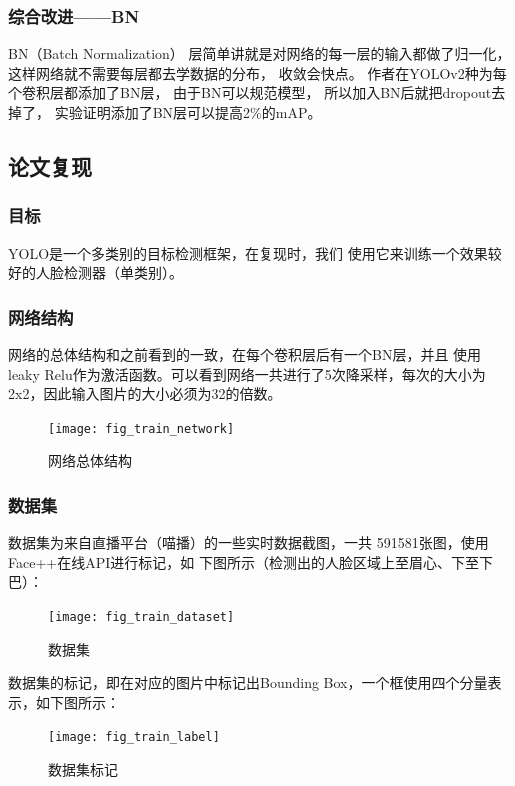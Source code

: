 \documentclass[a4paper, notitlepage]{article}
\begin{document}
\subsubsection{综合改进——BN}
BN（Batch Normalization）
层简单讲就是对网络的每一层的输入都做了归一化，
这样网络就不需要每层都去学数据的分布，
收敛会快点。
作者在YOLOv2种为每个卷积层都添加了BN层，
由于BN可以规范模型，
所以加入BN后就把dropout去掉了，
实验证明添加了BN层可以提高2\(\%\)的mAP。

\subsection{论文复现}

\subsubsection{目标}
YOLO是一个多类别的目标检测框架，在复现时，我们
使用它来训练一个效果较好的人脸检测器（单类别）。

\subsubsection{网络结构}
网络的总体结构和之前看到的一致，在每个卷积层后有一个BN层，并且
使用leaky Relu作为激活函数。可以看到网络一共进行了5次降采样，每次的大小为
2x2，因此输入图片的大小必须为32的倍数。

\begin{figure}[H]
    \centering
    \texttt{[image: fig\_train\_network]}
    \caption{网络总体结构}
    \label{fig:example}
\end{figure}

\subsubsection{数据集}
数据集为来自直播平台（喵播）的一些实时数据截图，一共
591581张图，使用Face++在线API进行标记，如
下图所示（检测出的人脸区域上至眉心、下至下巴）：

\begin{figure}[H]
    \centering
    \texttt{[image: fig\_train\_dataset]}
    \caption{数据集}
    \label{fig:example}
\end{figure}

数据集的标记，即在对应的图片中标记出Bounding Box，一个框使用四个分量表示，如下图所示：
\begin{figure}[H]
    \centering
    \texttt{[image: fig\_train\_label]}
    \caption{数据集标记}
    \label{fig:example}
\end{figure}
\end{document}

